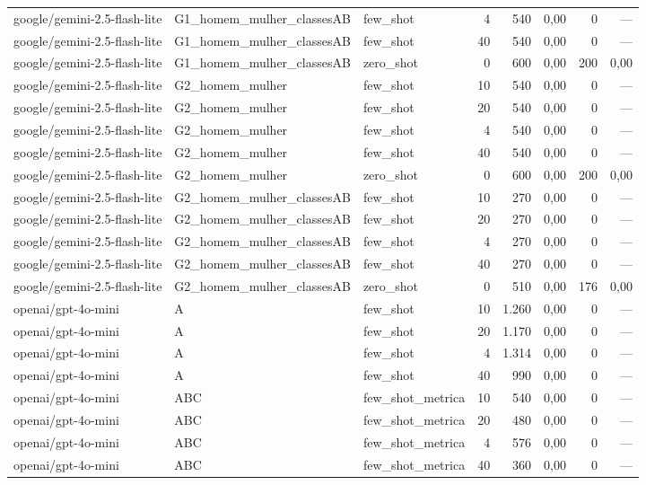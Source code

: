 \begin{table}[htbp]
\begin{tabular}{lllrrrrr}
google/gemini-2.5-flash-lite & G1\_homem\_mulher\_classesAB & few\_shot & 4 & 540 & 0,00 & 0 & — \\
google/gemini-2.5-flash-lite & G1\_homem\_mulher\_classesAB & few\_shot & 40 & 540 & 0,00 & 0 & — \\
google/gemini-2.5-flash-lite & G1\_homem\_mulher\_classesAB & zero\_shot & 0 & 600 & 0,00 & 200 & 0,00 \\
google/gemini-2.5-flash-lite & G2\_homem\_mulher & few\_shot & 10 & 540 & 0,00 & 0 & — \\
google/gemini-2.5-flash-lite & G2\_homem\_mulher & few\_shot & 20 & 540 & 0,00 & 0 & — \\
google/gemini-2.5-flash-lite & G2\_homem\_mulher & few\_shot & 4 & 540 & 0,00 & 0 & — \\
google/gemini-2.5-flash-lite & G2\_homem\_mulher & few\_shot & 40 & 540 & 0,00 & 0 & — \\
google/gemini-2.5-flash-lite & G2\_homem\_mulher & zero\_shot & 0 & 600 & 0,00 & 200 & 0,00 \\
google/gemini-2.5-flash-lite & G2\_homem\_mulher\_classesAB & few\_shot & 10 & 270 & 0,00 & 0 & — \\
google/gemini-2.5-flash-lite & G2\_homem\_mulher\_classesAB & few\_shot & 20 & 270 & 0,00 & 0 & — \\
google/gemini-2.5-flash-lite & G2\_homem\_mulher\_classesAB & few\_shot & 4 & 270 & 0,00 & 0 & — \\
google/gemini-2.5-flash-lite & G2\_homem\_mulher\_classesAB & few\_shot & 40 & 270 & 0,00 & 0 & — \\
google/gemini-2.5-flash-lite & G2\_homem\_mulher\_classesAB & zero\_shot & 0 & 510 & 0,00 & 176 & 0,00 \\
openai/gpt-4o-mini & A & few\_shot & 10 & 1.260 & 0,00 & 0 & — \\
openai/gpt-4o-mini & A & few\_shot & 20 & 1.170 & 0,00 & 0 & — \\
openai/gpt-4o-mini & A & few\_shot & 4 & 1.314 & 0,00 & 0 & — \\
openai/gpt-4o-mini & A & few\_shot & 40 & 990 & 0,00 & 0 & — \\
openai/gpt-4o-mini & ABC & few\_shot\_metrica & 10 & 540 & 0,00 & 0 & — \\
openai/gpt-4o-mini & ABC & few\_shot\_metrica & 20 & 480 & 0,00 & 0 & — \\
openai/gpt-4o-mini & ABC & few\_shot\_metrica & 4 & 576 & 0,00 & 0 & — \\
openai/gpt-4o-mini & ABC & few\_shot\_metrica & 40 & 360 & 0,00 & 0 & — \\

\end{tabular}
\end{table}
